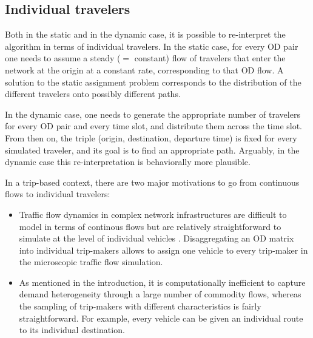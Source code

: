 \subsection{Individual travelers}
\label{sec:indiv-trav}

Both in the static and in the dynamic case, it is possible to
re-interpret the algorithm in terms of individual travelers.  
%
In the static case, for every OD pair one needs to
assume a steady ($=$ constant) flow of travelers that enter the
network at the origin at a constant rate, corresponding to that OD flow.
A solution to the static assignment problem corresponds to the
distribution of the different travelers onto possibly different paths.

In the dynamic case, one needs to generate the appropriate number of
travelers for every OD pair and every time slot, and distribute them
across the time slot.  From then on, the triple (origin, destination,
departure time) is fixed for every simulated traveler, and its goal is
to find an appropriate path.  
%
%
Arguably, in the dynamic case this re-interpretation is behaviorally
more plausible.

In a trip-based context, there are two major motivations to go from continuous flows to individual travelers:
\begin{itemize}

\item Traffic flow dynamics in complex network infrastructures are difficult to model in terms of continous flows \citep[e.g.,][]{floetteroed-2011a} but are relatively straightforward to simulate at the level of individual vehicles
\citep[][]{aimsun-www,mitsim-www,paramics-www,vissim-www}. 
Disaggregating an OD matrix into individual trip-makers allows to assign one vehicle to every trip-maker in the microscopic traffic flow simulation.

\item As mentioned in the introduction, it is computationally inefficient to capture demand heterogeneity through a large number of commodity flows, whereas the sampling of trip-makers with different characteristics is fairly straightforward. For example, every vehicle can be given an individual route to its individual destination.

\end{itemize}

